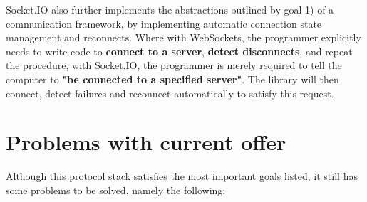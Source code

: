 \documentclass[conference]{IEEEtran}
\begin{document}
Socket.IO also further implements the abstractions outlined by goal 1) of a communication framework, by implementing automatic connection state management and reconnects. Where with WebSockets, the programmer explicitly needs to write code to \textbf{connect to a server},  \textbf{detect disconnects}, and repeat the procedure, with Socket.IO, the programmer is merely required to tell the computer to \textbf{"be connected to a specified server"}. The library will then connect, detect failures and reconnect automatically to satisfy this request. \cite{b1}


\section{Problems with current offer}

Although this protocol stack satisfies the most important goals listed, it still has some problems to be solved, namely the following:
\end{document}
